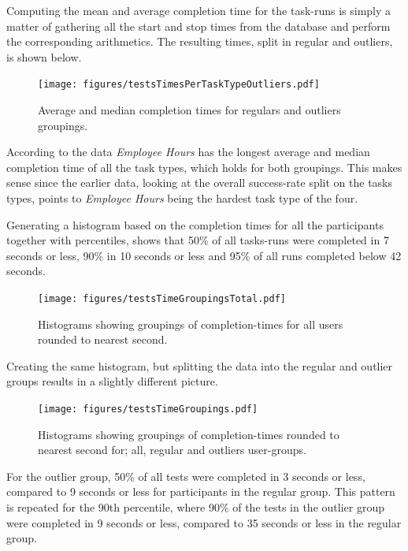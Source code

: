 \documentclass[nofilelist,dvipsnames]{cslthse-msc}
\begin{document}
        Computing the mean and average completion time for the task-runs is
        simply a matter of gathering all the start and stop times from the
        database and perform the corresponding arithmetics. The resulting times,
        split in regular and outliers, is shown below.
        \begin{figure}[h!]
          \centering
          \texttt{[image: figures/testsTimesPerTaskTypeOutliers.pdf]}
          \caption{Average and median completion times for regulars and outliers groupings. }
          \label{label_testsTimesPerTaskTypeOutliers}
        \end{figure}

        According to the data \textit{Employee Hours} has the longest average
        and median completion time of all the task types, which holds for both
        groupings. This makes sense since the earlier data, looking at the
        overall success-rate split on the tasks types, points to
        \textit{Employee Hours} being the hardest task type of the four.

        Generating a histogram based on the completion times for all the
        participants together with percentiles, shows that 50\% of all
        tasks-runs were completed in 7 seconds or less, 90\% in 10 seconds or
        less and 95\% of all runs completed below 42 seconds.

        \begin{figure}[h!]
          \centering
          \texttt{[image: figures/testsTimeGroupingsTotal.pdf]}
          \caption{
            Histograms showing groupings of completion-times for all users
            rounded to nearest second.
          }
        \end{figure}


        Creating the same histogram, but splitting the data into the regular
        and outlier groups results in a slightly different picture.

        \begin{figure}[h!]
          \centering
          \texttt{[image: figures/testsTimeGroupings.pdf]}
          \caption{
            Histograms showing groupings of completion-times rounded to nearest
            second for; all, regular and outliers user-groups.
          }
        \end{figure}

        For the outlier group, 50\% of all tests were completed in 3 seconds or
        less, compared to 9 seconds or less for participants in the regular
        group. This pattern is repeated for the 90th percentile, where 90\% of
        the tests in the outlier group were completed in 9 seconds or less,
        compared to 35 seconds or less in the regular group.
\end{document}
